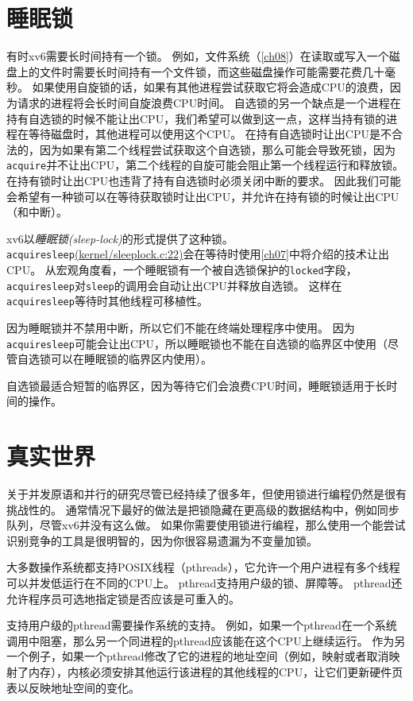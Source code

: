 \section{睡眠锁}
有时xv6需要长时间持有一个锁。
例如，文件系统（\autoref{ch08}）在读取或写入一个磁盘上的文件时需要长时间持有一个文件锁，而这些磁盘操作可能需要花费几十毫秒。
如果使用自旋锁的话，如果有其他进程尝试获取它将会造成CPU的浪费，因为请求的进程将会长时间自旋浪费CPU时间。
自选锁的另一个缺点是一个进程在持有自选锁的时候不能让出CPU，我们希望可以做到这一点，这样当持有锁的进程在等待磁盘时，其他进程可以使用这个CPU。
在持有自选锁时让出CPU是不合法的，因为如果有第二个线程尝试获取这个自选锁，那么可能会导致死锁，因为\texttt{acquire}并不让出CPU，第二个线程的自旋可能会阻止第一个线程运行和释放锁。
在持有锁时让出CPU也违背了持有自选锁时必须关闭中断的要求。
因此我们可能会希望有一种锁可以在等待获取锁时让出CPU，并允许在持有锁的时候让出CPU（和中断）。

xv6以\emph{睡眠锁(sleep-lock)}的形式提供了这种锁。
\texttt{acquiresleep}\href{https://github.com/mit-pdos/xv6-riscv/blob/risc/kernel/sleeplock.c#L22}{(kernel/sleeplock.c:22)}会在等待时使用\autoref{ch07}中将介绍的技术让出CPU。
从宏观角度看，一个睡眠锁有一个被自选锁保护的\texttt{locked}字段，\texttt{acquiresleep}对\texttt{sleep}的调用会自动让出CPU并释放自选锁。
这样在\texttt{acquiresleep}等待时其他线程可移植性。

因为睡眠锁并不禁用中断，所以它们不能在终端处理程序中使用。
因为\texttt{acquiresleep}可能会让出CPU，所以睡眠锁也不能在自选锁的临界区中使用（尽管自选锁可以在睡眠锁的临界区内使用）。

自选锁最适合短暂的临界区，因为等待它们会浪费CPU时间，睡眠锁适用于长时间的操作。

\section{真实世界}
关于并发原语和并行的研究尽管已经持续了很多年，但使用锁进行编程仍然是很有挑战性的。
通常情况下最好的做法是把锁隐藏在更高级的数据结构中，例如同步队列，尽管xv6并没有这么做。
如果你需要使用锁进行编程，那么使用一个能尝试识别竞争的工具是很明智的，因为你很容易遗漏为不变量加锁。

大多数操作系统都支持POSIX线程（pthreads），它允许一个用户进程有多个线程可以并发低运行在不同的CPU上。
pthread支持用户级的锁、屏障等。
pthread还允许程序员可选地指定锁是否应该是可重入的。

支持用户级的pthread需要操作系统的支持。
例如，如果一个pthread在一个系统调用中阻塞，那么另一个同进程的pthread应该能在这个CPU上继续运行。
作为另一个例子，如果一个pthread修改了它的进程的地址空间（例如，映射或者取消映射了内存），内核必须安排其他运行该进程的其他线程的CPU，让它们更新硬件页表以反映地址空间的变化。

